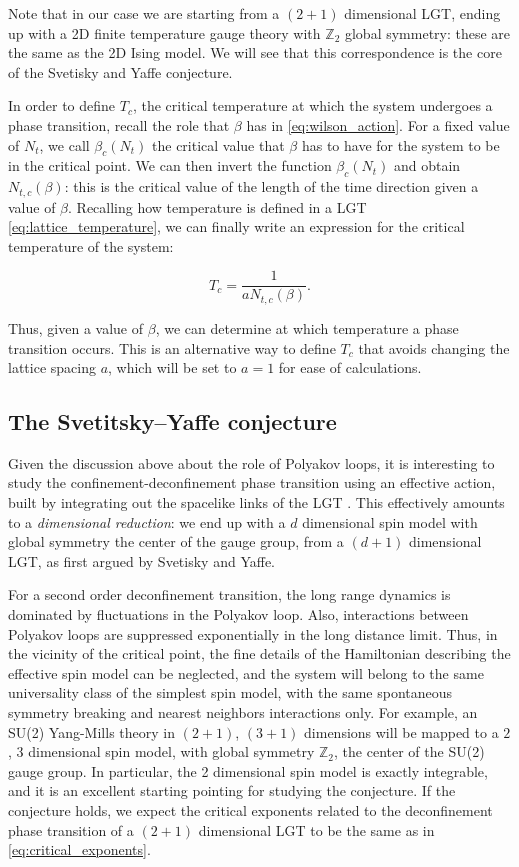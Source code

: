 \documentclass[reqno,12pt]{article}
\numberwithin{equation}{section}
\begin{document}
Note that in our case we are starting from a $(2+1)$ dimensional LGT, ending up with a 2D finite temperature gauge theory
with $\mathbb{Z}_2$ global symmetry: these are the same as the 2D Ising model. We will see that this correspondence 
is the core of the Svetisky and Yaffe conjecture.    

In order to define $T_c$, the critical temperature at which the system undergoes a phase transition, recall
the role that $\beta$ has in \eqref{eq:wilson_action}. For a fixed value of $N_t$, we call $\beta_c(N_t)$ the critical value
that $\beta$ has to have for the system to be in the critical point. We can then invert the function $\beta_c(N_t)$
and obtain $N_{t,c}(\beta)$: this is the critical value of the length of the time direction given a value of $\beta$.
Recalling how temperature is defined in a LGT \eqref{eq:lattice_temperature}, we can finally write an expression
for the critical temperature of the system:

\begin{equation} \label{eq:critical_temperature}
	T_c = \frac{1}{a N_{t,c}(\beta)}.
\end{equation}

Thus, given a value of $\beta$, we can determine at which temperature a phase transition occurs. This is an alternative way
to define $T_c$ that avoids changing the lattice spacing $a$, which will be set to $a = 1$ for ease of calculations. 


\subsection{The Svetitsky–Yaffe conjecture} \label{conjecture}

Given the discussion above about the role of Polyakov loops, it is interesting to study the confinement-deconfinement phase transition
using an effective action, built by integrating out the spacelike links of the LGT \cite{caristo} \cite{caselle}. This effectively
amounts to a \textit{dimensional reduction}: we end up with a $d$ dimensional spin model with global symmetry the center of the
gauge group, from a $(d+1)$ dimensional LGT, as first argued by Svetisky and Yaffe.

For a second order deconfinement transition, the long range dynamics is dominated by fluctuations in the Polyakov loop. Also,
interactions between Polyakov loops are suppressed exponentially in the long distance limit. Thus, in the vicinity of the 
critical point, the fine details of the Hamiltonian describing the effective spin model can be neglected, and the system will belong
to the same universality class of the simplest spin model, with the same spontaneous symmetry breaking and nearest neighbors interactions
only. For example, an SU(2) Yang-Mills theory in $(2+1)$, $(3+1)$ dimensions will be mapped to a $2$, $3$ dimensional spin model, with
global symmetry $\mathbb{Z}_2$, the center of the SU(2) gauge group. In particular, the 2 dimensional spin model is exactly integrable,
and it is an excellent starting pointing for studying the conjecture. If the conjecture holds, we expect
the critical exponents related to the deconfinement phase transition of a $(2+1)$ dimensional LGT to be the same as 
in \eqref{eq:critical_exponents}.
\end{document}
